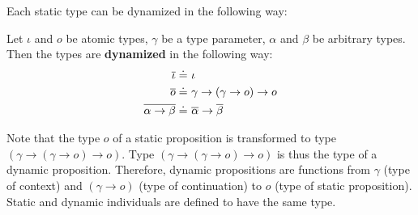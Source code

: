 Each static type can be dynamized in the following way:
\begin{definition}\label{def:DTypes-FO} Let $\iota$ and $o$ be atomic types, $\gamma$ be a type parameter, $\alpha$ and $\beta$ be arbitrary types. Then the types are \textbf{dynamized} in the following way:
\begin{subequations}
\begin{align}
\overline{\iota} \doteq \ &  \iota  \label{def:DTypes-FO:iota}\\
 \overline{o} \doteq \ & \gamma \rightarrow (\gamma \rightarrow o) \rightarrow o \label{def:DTypes-FO:o}\\
  \overline{\alpha \rightarrow \beta} \doteq \ & \overline{\alpha}  \rightarrow \overline{\beta} \label{def:DTypes-FO:atob}
\end{align}
\end{subequations}
\end{definition}
Note that the type $o$ of a static proposition is transformed to type $(\gamma \rightarrow (\gamma \rightarrow o) \rightarrow o)$. Type $(\gamma \rightarrow (\gamma \rightarrow o) \rightarrow o)$ is thus the type of a dynamic proposition. Therefore, dynamic propositions are functions from $\gamma$ (type of context) and $(\gamma \rightarrow o)$ (type of continuation) to $o$ (type of static proposition).
Static and dynamic individuals are defined to have the same type.

